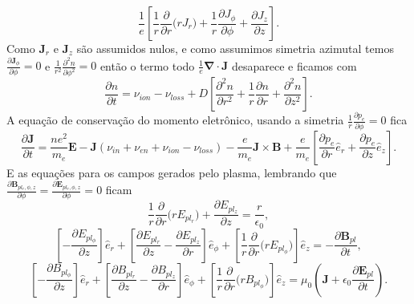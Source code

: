 \begin{frame}
\begin{equation}
\frac{1}{e}  \left[ \frac{1}{r}  \frac{\partial }{\partial r}\Big(r J_r\Big) + \frac{1}{r} \frac{\partial J_\phi}{\partial \phi} +  \frac{\partial J_z}{\partial z} \right] .
\end{equation}
Como $\bm{J}_r$ e $\bm{J}_z$ são assumidos nulos, e como assumimos simetria azimutal temos $\frac{\partial \bm{J}_\phi}{\partial \phi} = 0$ e $ \frac{1}{r^2} \frac{\partial^2 n}{\partial \phi^2}=0$ então o termo todo $\frac{1}{e} \bm{\nabla} \cdot \bm{J}$ desaparece e ficamos com
\begin{equation}
\frac{\partial n}{\partial t} = \nu_{ion} - \nu_{loss}+D \left[  \frac{\partial^2 n}{\partial r^2} + \frac{1}{r} \frac{\partial n}{\partial r}  + \frac{\partial^2 n}{\partial z^2} \right] .
\end{equation}
A equação de conservação do momento eletrônico, usando a simetria  $\frac{1}{r} \frac{\partial p_e}{\partial \phi}  = 0$ fica
\begin{equation}
\label{momenteletrico1} 
\frac{\partial \bm{J}}{\partial t} =  \frac{ne^2}{m_e} \bm{E} -\bm{J}(\nu_{in}+\nu_{en}+\nu_{ion}-\nu_{loss}) -\frac{e}{m_e}\bm{J} \times \bm{B}+\frac{e}{m_e} \left[ \frac{\partial p_e}{\partial r} \hat{e}_r + \frac{\partial p_e}{\partial z} \hat{e}_z \right] .
\end{equation}
E as equações para os campos gerados pelo plasma, lembrando que $\frac{\partial \bm{B}_{pl_r,\phi,z}}{\partial \phi} = \frac{\partial \bm{E}_{pl_r,\phi,z}}{\partial \phi} = 0$ ficam
\begin{equation}
\frac{1}{r}  \frac{\partial}{\partial r} \big( r E_{pl_r} \big) +  \frac{\partial E_{pl_z}}{\partial z}   = \frac{r}{\epsilon_0},
\end{equation}
\begin{equation}
\left[- \frac{\partial E_{pl_\phi}}{\partial z} \right]  \hat{e}_r + \left[  \frac{\partial E_{pl_r}}{\partial z} -  \frac{\partial E_{pl_z}}{\partial r}  \right] \hat{e}_\phi + \left[ \frac{1}{r} \frac{\partial}{\partial r} \big( r E_{pl_\phi} \big)  \right] \hat{e}_z = -\frac{\partial \bm{B}_{pl}}{\partial t},
\end{equation}
\begin{equation}
\left[ - \frac{\partial B_{pl_\phi}}{\partial z} \right]  \hat{e}_r + \left[  \frac{\partial B_{pl_r}}{\partial z} -  \frac{\partial B_{pl_z}}{\partial r}  \right] \hat{e}_\phi + \left[ \frac{1}{r} \frac{\partial}{\partial r} \big( r B_{pl_\phi} \big) \right] \hat{e}_z = \mu_0 (\bm{J} + \epsilon_0 \frac{\partial \bm{E}_{pl}}{\partial t} ) .

\end{equation}
\end{frame}
